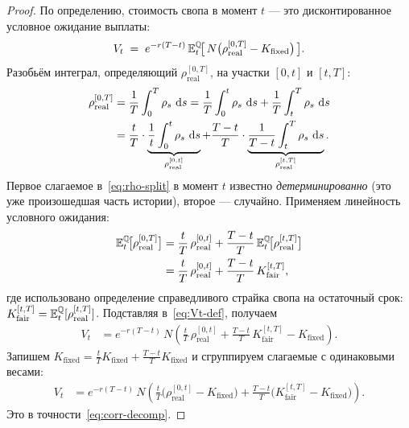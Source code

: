 \begin{proof}
По определению, стоимость свопа в момент $t$ --- это дисконтированное
условное ожидание выплаты:
\begin{equation}
\label{eq:Vt-def}
  V_t \;=\; e^{-r(T-t)}\,
           \mathbb{E}_t^{\mathbb{Q}}\!\bigl[\,N\bigl(\rho_{\text{real}}^{[0,T]}-K_{\text{fixed}}\bigr)\,\bigr].
\end{equation}
Разобьём интеграл, определяющий $\rho_{\text{real}}^{[0,T]}$, на участки
$[0,t]$ и $[t,T]$:
\begin{align}
  \rho_{\text{real}}^{[0,T]}
  &= \frac{1}{T}\int_{0}^{T}\rho_s\,\,\mathrm{d} s
   = \frac{1}{T}\int_{0}^{t}\rho_s\,\,\mathrm{d} s
   + \frac{1}{T}\int_{t}^{T}\rho_s\,\,\mathrm{d} s \notag\\
  &= \frac{t}{T}\cdot\underbrace{\frac{1}{t}\int_{0}^{t}\rho_s\,\,\mathrm{d} s}_{\rho_{\text{real}}^{[0,t]}}
   + \frac{T-t}{T}\cdot\underbrace{\frac{1}{T-t}\int_{t}^{T}\rho_s\,\,\mathrm{d} s}_{\rho_{\text{real}}^{[t,T]}}.
\label{eq:rho-split}
\end{align}
Первое слагаемое в~\eqref{eq:rho-split} в момент $t$ известно
\emph{детерминированно} (это уже произошедшая часть истории), второе
--- случайно. Применяем линейность условного ожидания:
\begin{align*}
  \mathbb{E}_t^{\mathbb{Q}}\!\bigl[\rho_{\text{real}}^{[0,T]}\bigr]
  &= \frac{t}{T}\,\rho_{\text{real}}^{[0,t]}
   + \frac{T-t}{T}\,\mathbb{E}_t^{\mathbb{Q}}\!\bigl[\rho_{\text{real}}^{[t,T]}\bigr] \\
  &= \frac{t}{T}\,\rho_{\text{real}}^{[0,t]}
   + \frac{T-t}{T}\,K_{\text{fair}}^{[t,T]},
\end{align*}
где использовано определение справедливого страйка свопа на остаточный
срок: $K_{\text{fair}}^{[t,T]} = \mathbb{E}_t^{\mathbb{Q}}[\rho_{\text{real}}^{[t,T]}]$.
Подставляя в~\eqref{eq:Vt-def}, получаем
\begin{align*}
  V_t
  &= e^{-r(T-t)}\,N\!\left(
       \frac{t}{T}\,\rho_{\text{real}}^{[0,t]}
     + \frac{T-t}{T}\,K_{\text{fair}}^{[t,T]}
     - K_{\text{fixed}}
     \right).
\end{align*}
Запишем $K_{\text{fixed}} = \tfrac{t}{T}K_{\text{fixed}} + \tfrac{T-t}{T}K_{\text{fixed}}$
и сгруппируем слагаемые с одинаковыми весами:
\begin{align*}
  V_t
  &= e^{-r(T-t)}\,N\!\left(
       \tfrac{t}{T}\bigl(\rho_{\text{real}}^{[0,t]} - K_{\text{fixed}}\bigr)
     + \tfrac{T-t}{T}\bigl(K_{\text{fair}}^{[t,T]} - K_{\text{fixed}}\bigr)
     \right).
\end{align*}
Это в точности~\eqref{eq:corr-decomp}.
\end{proof}

